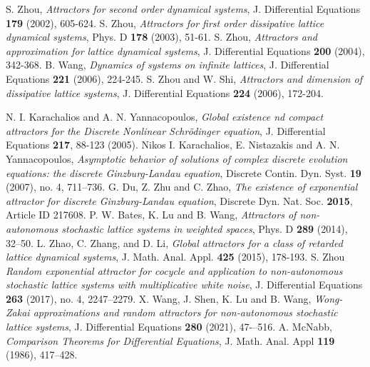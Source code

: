 \documentclass[preprintnumbers,amsmath,amssymb]{revtex4}
\begin{document}
\begin{thebibliography}{99}
%
 S. Zhou, {\em Attractors for second order dynamical 
	systems}, J. Differential Equations {\bf 179} (2002), 605-624.
%
 S. Zhou, {\em Attractors for first order dissipative lattice dynamical 
	systems}, Phys. D  {\bf 178} (2003), 51-61.
%
 S. Zhou, {\em Attractors and approximation for lattice dynamical systems}, J. Differential Equations {\bf 200} (2004), 342-368. 
%
%
 B. Wang, {\em Dynamics of systems on infinite lattices}, J. Differential Equations {\bf 221} (2006), 224-245.
%
 S. Zhou and W. Shi, {\em Attractors and dimension of dissipative lattice systems}, J. Differential Equations {\bf 224} (2006), 172-204.
%

%
%
 N. I. Karachalios and A. N. Yannacopoulos, {\em Global existence nd compact attractors for the Discrete Nonlinear Schr\"odinger equation}, J. Differential Equations {\bf 217}, 88-123 (2005).
%
 Nikos I. Karachalios, E. Nistazakis and A. N. Yannacopoulos, {\em Asymptotic behavior of solutions of complex discrete evolution equations: the discrete Ginzburg-Landau equation}, Discrete Contin. Dyn. Syst. \textbf{19} (2007), no. 4, 711--736.
%
 G. Du, Z. Zhu and C. Zhao, {\em The existence of exponential attractor for discrete Ginzburg-Landau equation}, Discrete Dyn. Nat. Soc. {\bf 2015}, Article ID 217608.
%
 P. W. Bates,  K. Lu and B. Wang, {\em Attractors of non-autonomous stochastic lattice systems in weighted spaces}, Phys. D \textbf{289} (2014), 32–50.
%
 L. Zhao, C. Zhang, and D. Li, {\em Global attractors for a class of retarded lattice dynamical systems}, J. Math. Anal. Appl. 
{\bf 425} (2015), 178-193.
%
 S. Zhou {\em Random exponential attractor for cocycle and application to non-autonomous stochastic lattice systems with multiplicative white noise}, J. Differential Equations \textbf{263} (2017), no. 4, 2247–2279.
%
 X. Wang, J. Shen,  K. Lu and  B. Wang, {\em Wong-Zakai approximations and random attractors for non-autonomous stochastic lattice systems}, J. Differential Equations \textbf{280} (2021), 47-–516.
%
 A. McNabb, {\em Comparison Theorems for Differential Equations}, J. Math. Anal. Appl \textbf{119} (1986), 417--428.

\end{thebibliography}
\end{document}
